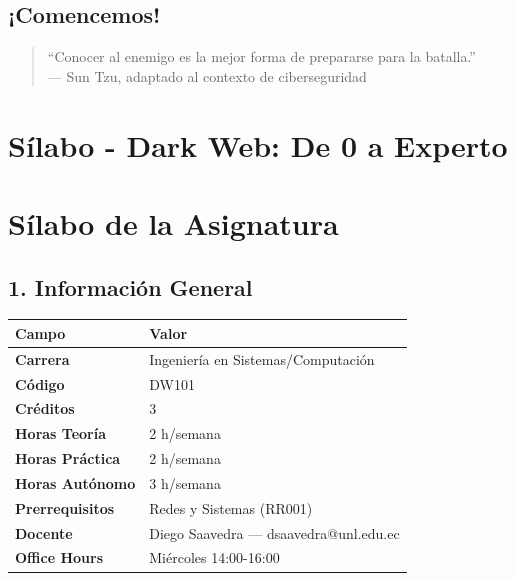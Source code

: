 \documentclass[
  letterpaper,
]{report}
\newcounter{none} %
\begin{document}
\section{¡Comencemos!}\label{comencemos}

\begin{quote}
``Conocer al enemigo es la mejor forma de prepararse para la
batalla.''\\
--- Sun Tzu, adaptado al contexto de ciberseguridad
\end{quote}


\chapter{Sílabo - Dark Web: De 0 a
Experto}\label{suxedlabo---dark-web-de-0-a-experto}


\chapter{Sílabo de la Asignatura}\label{suxedlabo-de-la-asignatura}

\section{1. Información General}\label{informaciuxf3n-general}

{\def\LTcaptype{none} %
\begin{longtable}[]{@{}ll@{}}
\toprule\noalign{}
Campo & Valor \\
\midrule\noalign{}
\endhead
\bottomrule\noalign{}
\endlastfoot
\textbf{Carrera} & Ingeniería en Sistemas/Computación \\
\textbf{Código} & DW101 \\
\textbf{Créditos} & 3 \\
\textbf{Horas Teoría} & 2 h/semana \\
\textbf{Horas Práctica} & 2 h/semana \\
\textbf{Horas Autónomo} & 3 h/semana \\
\textbf{Prerrequisitos} & Redes y Sistemas (RR001) \\
\textbf{Docente} & Diego Saavedra --- dsaavedra@unl.edu.ec \\
\textbf{Office Hours} & Miércoles 14:00-16:00 \\
\end{longtable}
}
\end{document}
